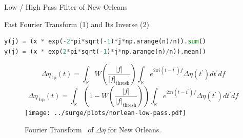 \documentclass[usenames, dvipsnames]{beamer}
\begin{document}
\begin{frame}[fragile]{Low / High Pass Filter of New Orleans }
\vspace{-10pt}
\begin{block}{Fast Fourier Transform (1) and Its Inverse (2)}
\vspace{-10pt}
\begin{lstlisting}[firstnumber=1, language=python, label=glabels, xleftmargin=0pt]
y(j) = (x * exp(-2*pi*sqrt(-1)*j*np.arange(n)/n)).sum()
y(j) = (x * exp(2*pi*sqrt(-1)*j*np.arange(n)/n)).mean()
\end{lstlisting}
\end{block}
\vspace{-30pt}
\begin{figure}[htb!]
\begin{equation}
\Delta\eta_{\;\mathrm{lp}}(t) = \int_{\mathbb{R}}W\left(\frac{|f|}
{|f|_{\mathrm{thresh}}}\right)\int_{\mathbb{R}}e^{2\pi i
(t-t^{\prime})f }\Delta \eta(t^{\prime})dt^{\prime}df
\end{equation}
\begin{equation}
\Delta\eta_{\;\mathrm{hp}}(t) = \int_{\mathbb{R}}\left(1-W\left(\frac{|f|}
{|f|_{\mathrm{thresh}}}\right)\right)\int_{\mathbb{R}}e^{2\pi i
(t-t^{\prime})f }\Delta \eta(t^{\prime})dt^{\prime}df
\end{equation}
    \centering
    \texttt{[image: ../surge/plots/norlean-low-pass.pdf]}
    \vspace{-15pt}
    \caption{Fourier Transform~\cite{cooley1965algorithm} of $\Delta\eta$ for New Orleans.}
    \label{fig:A}
\end{figure}
\end{frame}
\end{document}
